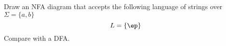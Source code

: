 Draw an NFA diagram that accepts the following
language of strings over $\Sigma =
\{ a, b \}$ 
\[
L = \{\ep\}
\]
Compare with a DFA.
